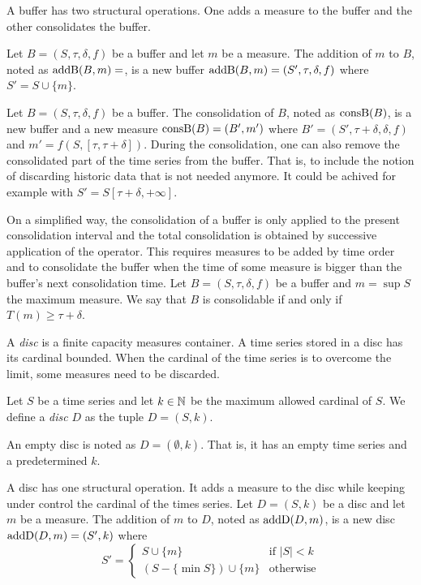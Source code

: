 A buffer has two structural operations. One adds a measure to the
buffer and the other consolidates the buffer.

Let $B=(S,\tau,\delta,f)$ be a buffer and let $m$ be a measure.  The
addition of $m$ to $B$, noted as $\operatorname{addB}(B,m)=$, is a new buffer
$\operatorname{addB}(B,m)=(S',\tau,\delta,f)$ where $S' = S \cup \{m\} $.

Let $B=(S,\tau,\delta,f)$ be a buffer. The consolidation of $B$, noted
as $\operatorname{consB}(B)$, is a new buffer and a new measure $\operatorname{consB}(B)=(B',m')$
where $ B'= (S',\tau+\delta,\delta,f)$ and $m' =
f(S,[\tau,\tau+\delta])$. During the consolidation, one can also remove the
consolidated part of the time series from the buffer. That is, to
include the notion of discarding historic data that is not needed
anymore. It could be achived for example with $S' =
S[\tau+\delta,+\infty]$.


On a simplified way, the consolidation of a buffer is only applied to
the present consolidation interval and the total consolidation is
obtained by successive application of the operator. This requires
measures to be added by time order and to consolidate the buffer when
the time of some measure is bigger than the buffer's next
consolidation time.  Let $B=(S,\tau,\delta,f)$ be a buffer and
$m=\sup S$ the maximum measure. We say that $B$ is consolidable if and only if
$T(m) \geq \tau+\delta$.


A \emph{disc} is a finite capacity measures container. A time series
stored in a disc has its cardinal bounded. When the cardinal of the
time series is to overcome the limit, some measures need to be
discarded.
\begin{definition}%
  Let $S$ be a time series and let $k\in\mathbb{N}$ be the maximum allowed
  cardinal of $S$. We define a \emph{disc} $D$ as the tuple
  $D=(S,k)$. 
\end{definition}

An empty disc is noted as $D = (\emptyset,k)$. That is, it has an
empty time series and a predetermined $k$.

A disc has one structural operation.  It adds a measure to the disc
while keeping under control the cardinal of the times series. Let
$D=(S,k)$ be a disc and let $m$ be a measure.  The addition of $m$ to
$D$, noted as $\operatorname{addD}(D,m)$, is a new disc $\operatorname{addD}(D,m)=(S',k)$ where %
\[
 S' = \begin{cases}
  S\cup\{m\}                 & \text{if } |S|<k  \\
  (S-\{\min S\}) \cup \{m\} & \text{otherwise}
\end{cases}  
\]


